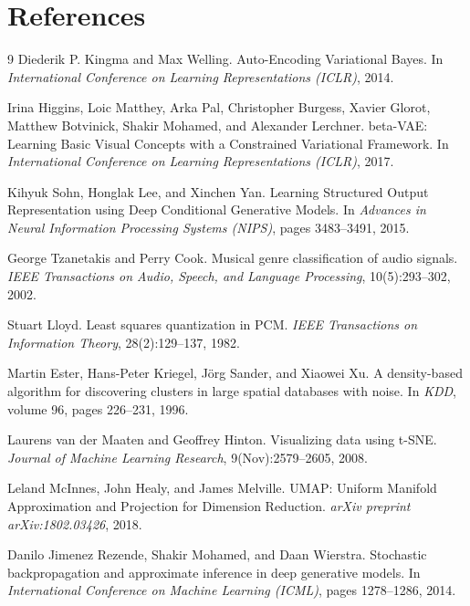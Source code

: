 \documentclass[11pt]{article}
\begin{document}
\section*{References}
\begin{thebibliography}{9}
 Diederik P. Kingma and Max Welling. Auto-Encoding Variational Bayes. In \emph{International Conference on Learning Representations (ICLR)}, 2014.

 Irina Higgins, Loic Matthey, Arka Pal, Christopher Burgess, Xavier Glorot, Matthew Botvinick, Shakir Mohamed, and Alexander Lerchner. beta-VAE: Learning Basic Visual Concepts with a Constrained Variational Framework. In \emph{International Conference on Learning Representations (ICLR)}, 2017.

 Kihyuk Sohn, Honglak Lee, and Xinchen Yan. Learning Structured Output Representation using Deep Conditional Generative Models. In \emph{Advances in Neural Information Processing Systems (NIPS)}, pages 3483--3491, 2015.

 George Tzanetakis and Perry Cook. Musical genre classification of audio signals. \emph{IEEE Transactions on Audio, Speech, and Language Processing}, 10(5):293--302, 2002.

 Stuart Lloyd. Least squares quantization in PCM. \emph{IEEE Transactions on Information Theory}, 28(2):129--137, 1982.

 Martin Ester, Hans-Peter Kriegel, Jörg Sander, and Xiaowei Xu. A density-based algorithm for discovering clusters in large spatial databases with noise. In \emph{KDD}, volume 96, pages 226--231, 1996.

 Laurens van der Maaten and Geoffrey Hinton. Visualizing data using t-SNE. \emph{Journal of Machine Learning Research}, 9(Nov):2579--2605, 2008.

 Leland McInnes, John Healy, and James Melville. UMAP: Uniform Manifold Approximation and Projection for Dimension Reduction. \emph{arXiv preprint arXiv:1802.03426}, 2018.

 Danilo Jimenez Rezende, Shakir Mohamed, and Daan Wierstra. Stochastic backpropagation and approximate inference in deep generative models. In \emph{International Conference on Machine Learning (ICML)}, pages 1278--1286, 2014.
\end{thebibliography}
\end{document}
